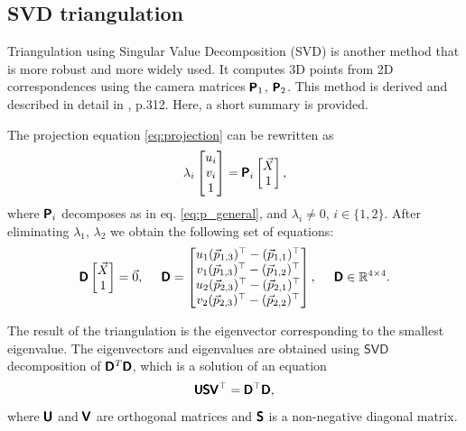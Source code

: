 \subsection{SVD triangulation}
\label{sec:svdtriang}
Triangulation using Singular Value Decomposition (SVD) is another method that is more robust and more widely used.
It computes 3D points from 2D correspondences using the camera matrices $\pmb{\mathsf{P}}_1$, $\pmb{\mathsf{P}}_2$. 
This method is derived and described in detail in \cite{hartley_zisserman_2004}, p.312. Here, a short summary is provided.

The projection equation \eqref{eq:projection} can be rewritten as
\begin{equation}
    \lambda_i \begin{bmatrix} 
        u_i \\ v_i \\ 1 \end{bmatrix} = \pmb{\mathsf{P}}_i
    \begin{bmatrix} \vec{X} \\ 1
    \end{bmatrix},
\end{equation} 
where $\pmb{\mathsf{P}}_i$ decomposes as in eq. \eqref{eq:p_general}, and $\lambda_i \neq 0$, $i \in \{1, 2\}$.
After eliminating $\lambda_1$, $\lambda_2$ we obtain the following set of equations:
\begin{equation}
    \pmb{\mathsf{D}} \begin{bmatrix} \vec{X} \\ 1 \end{bmatrix} = \vec{0}, \;\;\;\;\;
    \pmb{\mathsf{D}} = \begin{bmatrix}
        u_1 (\vec{p}_{1, 3})^\top - (\vec{p}_{1, 1})^\top \\
        v_1 (\vec{p}_{1, 3})^\top - (\vec{p}_{1, 2})^\top \\
        u_2 (\vec{p}_{2, 3})^\top - (\vec{p}_{2, 1})^\top \\
        v_2 (\vec{p}_{2, 3})^\top - (\vec{p}_{2, 2})^\top \\
    \end{bmatrix}, \;\;\;\;\; \pmb{\mathsf{D}} \in \mathbb{R}^{4 \times 4}.
\end{equation}

The result of the triangulation is the eigenvector corresponding to the smallest eigenvalue.
The eigenvectors and eigenvalues are obtained using $\mathsf{SVD}$ decomposition of $\pmb{\mathsf{D}}^T\pmb{\mathsf{D}}$, which is a solution of an equation
\begin{equation}
    \pmb{\mathsf{U}}\pmb{\mathsf{S}}\pmb{\mathsf{V}}^\top = \pmb{\mathsf{D}}^\top\pmb{\mathsf{D}},
\end{equation}
where $\pmb{\mathsf{U}}$ and $\pmb{\mathsf{V}}$ are orthogonal matrices and $\pmb{\mathsf{S}}$ is a non-negative diagonal matrix.

